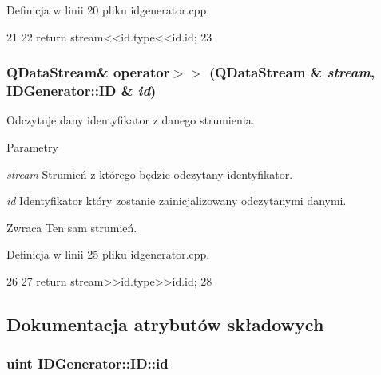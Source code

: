 Definicja w linii 20 pliku idgenerator.cpp.




\begin{DoxyCode}
21 {
22     return stream<<id.type<<id.id;
23 }
\end{DoxyCode}


\hypertarget{classIDGenerator_1_1ID_a30f4c9e493a25817666bb64ce4fd1168}{
\subsubsection[{operator$>$$>$}]{\setlength{\rightskip}{0pt plus 5cm}QDataStream\& operator$>$$>$ (QDataStream \& {\em stream}, \/  {\bf IDGenerator::ID} \& {\em id})}}
\label{classIDGenerator_1_1ID_a30f4c9e493a25817666bb64ce4fd1168}


Odczytuje dany identyfikator z danego strumienia. 


\begin{DoxyParams}{Parametry}
\item[{\em stream}]Strumień z którego będzie odczytany identyfikator. \item[{\em id}]Identyfikator który zostanie zainicjalizowany odczytanymi danymi. \end{DoxyParams}
\begin{DoxyReturn}{Zwraca}
Ten sam strumień. 
\end{DoxyReturn}


Definicja w linii 25 pliku idgenerator.cpp.




\begin{DoxyCode}
26 {
27     return stream>>id.type>>id.id;
28 }
\end{DoxyCode}




\subsection{Dokumentacja atrybutów składowych}
\hypertarget{classIDGenerator_1_1ID_a284b4a6d5b96b758a3ba11b5539d0878}{
\subsubsection[{id}]{\setlength{\rightskip}{0pt plus 5cm}uint {\bf IDGenerator::ID::id}}}
\label{classIDGenerator_1_1ID_a284b4a6d5b96b758a3ba11b5539d0878}


